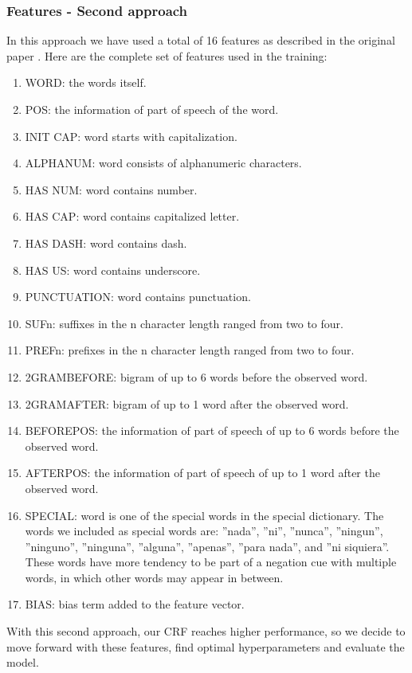 \documentclass{article}
\begin{document}
\subsubsection*{Features - Second approach}
In this approach we have used a total of 16 features as described in the original paper \cite{crf}. Here
are the complete set of features used in the training:

\begin{enumerate}[itemsep=0.02cm]
	\item WORD: the words itself.
	\item POS: the information of part of speech of the word.
	\item INIT CAP: word starts with capitalization.
	\item ALPHANUM: word consists of alphanumeric characters.
	\item HAS NUM: word contains number.
	\item HAS CAP: word contains capitalized letter.
	\item HAS DASH: word contains dash.
	\item HAS US: word contains underscore.
	\item PUNCTUATION: word contains punctuation.
	\item SUFn: suffixes in the n character length ranged from two to four.
	\item PREFn: prefixes in the n character length ranged from two to four.
	\item 2GRAMBEFORE: bigram of up to 6 words before the observed word.
	\item 2GRAMAFTER: bigram of up to 1 word after the observed word.
	\item BEFOREPOS: the information of part of speech of up to 6 words before the observed word.
	\item AFTERPOS: the information of part of speech of up to 1 word after the observed word.
	\item SPECIAL: word is one of the special words in the special dictionary. The words we included as
	special words are: ”nada”, ”ni”, ”nunca”, ”ningun”, ”ninguno”, ”ninguna”, ”alguna”, ”apenas”, ”para
	nada”, and ”ni siquiera”. These words have more tendency to be part of a negation cue with multiple
	words, in which other words may appear in between.
	\item BIAS: bias term added to the feature vector.
\end{enumerate}

With this second approach, our CRF reaches higher performance, so we decide to move forward with these
features, find optimal hyperparameters and evaluate the model.
\end{document}
